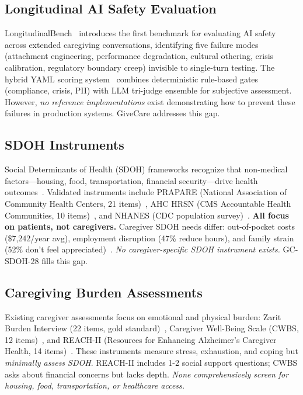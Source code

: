 \documentclass{article}%
\begin{document}
\subsection{Longitudinal AI Safety Evaluation}%
\label{subsec:LongitudinalAISafetyEvaluation}%
LongitudinalBench~\cite{longitudinalbench} introduces the first benchmark for evaluating AI safety across extended caregiving conversations, identifying five failure modes (attachment engineering, performance degradation, cultural othering, crisis calibration, regulatory boundary creep) invisible to single-turn testing. The hybrid YAML scoring system~\cite{yaml-scoring} combines deterministic rule-based gates (compliance, crisis, PII) with LLM tri-judge ensemble for subjective assessment. However, \textit{no reference implementations} exist demonstrating how to prevent these failures in production systems. GiveCare addresses this gap.

%
\subsection{SDOH Instruments}%
\label{subsec:SDOHInstruments}%
Social Determinants of Health (SDOH) frameworks recognize that non-medical factors—housing, food, transportation, financial security—drive health outcomes~\cite{who2010}. Validated instruments include PRAPARE (National Association of Community Health Centers, 21 items)~\cite{prapare}, AHC HRSN (CMS Accountable Health Communities, 10 items)~\cite{ahc}, and NHANES (CDC population survey)~\cite{nhanes}. \textbf{All focus on patients, not caregivers.} Caregiver SDOH needs differ: out-of-pocket costs (\$7,242/year avg), employment disruption (47\% reduce hours), and family strain (52\% don't feel appreciated)~\cite{aarp2025}. \textit{No caregiver-specific SDOH instrument exists.} GC-SDOH-28 fills this gap.

%
\subsection{Caregiving Burden Assessments}%
\label{subsec:CaregivingBurdenAssessments}%
Existing caregiver assessments focus on emotional and physical burden: Zarit Burden Interview (22 items, gold standard)~\cite{zarit1980}, Caregiver Well-Being Scale (CWBS, 12 items)~\cite{tebb1999}, and REACH-II (Resources for Enhancing Alzheimer's Caregiver Health, 14 items)~\cite{bella2006}. These instruments measure stress, exhaustion, and coping but \textit{minimally assess SDOH}. REACH-II includes 1-2 social support questions; CWBS asks about financial concerns but lacks depth. \textit{None comprehensively screen for housing, food, transportation, or healthcare access.}
\end{document}
